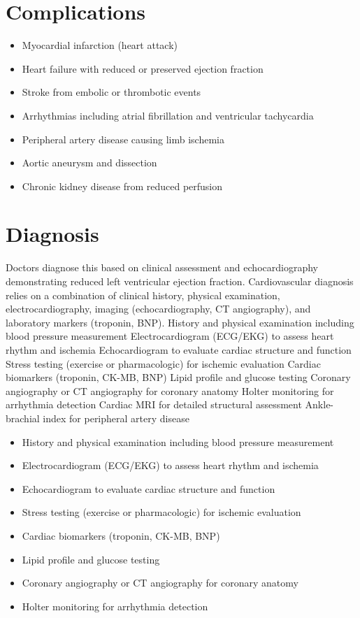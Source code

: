 \section{Complications}
\begin{itemize}[noitemsep]
  \item Myocardial infarction (heart attack)
  \item Heart failure with reduced or preserved ejection fraction
  \item Stroke from embolic or thrombotic events
  \item Arrhythmias including atrial fibrillation and ventricular tachycardia
  \item Peripheral artery disease causing limb ischemia
  \item Aortic aneurysm and dissection
  \item Chronic kidney disease from reduced perfusion
\end{itemize}
\section{Diagnosis}
Doctors diagnose this based on clinical assessment and echocardiography demonstrating reduced left ventricular ejection fraction. Cardiovascular diagnosis relies on a combination of clinical history, physical examination, electrocardiography, imaging (echocardiography, CT angiography), and laboratory markers (troponin, BNP). History and physical examination including blood pressure measurement Electrocardiogram (ECG/EKG) to assess heart rhythm and ischemia Echocardiogram to evaluate cardiac structure and function Stress testing (exercise or pharmacologic) for ischemic evaluation Cardiac biomarkers (troponin, CK-MB, BNP) Lipid profile and glucose testing Coronary angiography or CT angiography for coronary anatomy Holter monitoring for arrhythmia detection Cardiac MRI for detailed structural assessment Ankle-brachial index for peripheral artery disease

\begin{itemize}[noitemsep]
  \item History and physical examination including blood pressure measurement
  \item Electrocardiogram (ECG/EKG) to assess heart rhythm and ischemia
  \item Echocardiogram to evaluate cardiac structure and function
  \item Stress testing (exercise or pharmacologic) for ischemic evaluation
  \item Cardiac biomarkers (troponin, CK-MB, BNP)
  \item Lipid profile and glucose testing
  \item Coronary angiography or CT angiography for coronary anatomy
  \item Holter monitoring for arrhythmia detection
\end{itemize}
